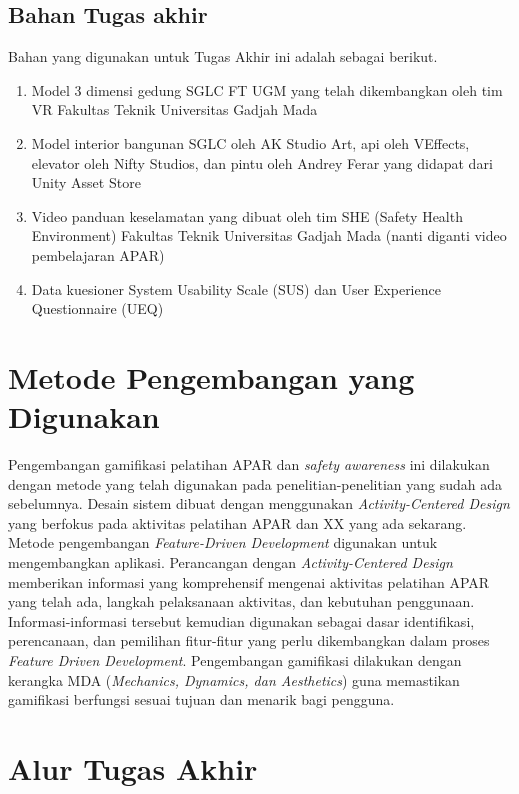 \subsection{Bahan Tugas akhir}

Bahan yang digunakan untuk Tugas Akhir ini adalah sebagai berikut.

\begin{enumerate}
	\item Model 3 dimensi gedung SGLC FT UGM yang telah dikembangkan oleh tim VR Fakultas Teknik Universitas Gadjah Mada
	\item Model interior bangunan SGLC oleh AK Studio Art, api oleh VEffects, elevator oleh Nifty Studios, dan pintu oleh Andrey Ferar yang didapat dari Unity Asset Store
	\item Video panduan keselamatan yang dibuat oleh tim SHE (Safety Health Environment) Fakultas Teknik Universitas Gadjah Mada (nanti diganti video pembelajaran APAR)
	\item Data kuesioner System Usability Scale (SUS) dan User Experience Questionnaire (UEQ)
	
\end{enumerate}



\section{Metode Pengembangan yang Digunakan}

Pengembangan gamifikasi pelatihan APAR dan \textit{safety awareness} ini dilakukan dengan metode yang telah digunakan pada penelitian-penelitian yang sudah ada sebelumnya. Desain sistem dibuat dengan menggunakan \textit{Activity-Centered Design} yang berfokus pada aktivitas pelatihan APAR dan XX yang ada sekarang. Metode pengembangan \textit{Feature-Driven Development} digunakan untuk mengembangkan aplikasi. Perancangan dengan \textit{Activity-Centered Design} memberikan informasi yang komprehensif mengenai aktivitas pelatihan APAR yang telah ada, langkah pelaksanaan aktivitas, dan kebutuhan penggunaan. Informasi-informasi tersebut kemudian digunakan sebagai dasar identifikasi, perencanaan, dan pemilihan fitur-fitur yang perlu dikembangkan dalam proses \textit{Feature Driven Development}. Pengembangan gamifikasi dilakukan dengan kerangka MDA (\textit{Mechanics, Dynamics, dan Aesthetics}) guna memastikan gamifikasi berfungsi sesuai tujuan dan menarik bagi pengguna.
\section{Alur Tugas Akhir}

